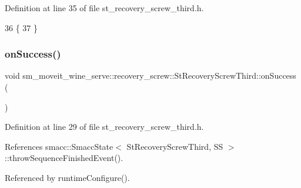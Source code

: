 Definition at line 35 of file st\+\_\+recovery\+\_\+screw\+\_\+third.\+h.


\begin{DoxyCode}
36             \{
37             \}
\end{DoxyCode}
\mbox{\label{structsm__moveit__wine__serve_1_1recovery__screw_1_1StRecoveryScrewThird_a2bbe0e017dd3c7441be93c1911e46614}} 
\subsubsection{\texorpdfstring{on\+Success()}{onSuccess()}}
{\footnotesize\ttfamily void sm\+\_\+moveit\+\_\+wine\+\_\+serve\+::recovery\+\_\+screw\+::\+St\+Recovery\+Screw\+Third\+::on\+Success (\begin{DoxyParamCaption}{ }\end{DoxyParamCaption})\hspace{0.3cm}{\ttfamily [inline]}}



Definition at line 29 of file st\+\_\+recovery\+\_\+screw\+\_\+third.\+h.



References smacc\+::\+Smacc\+State$<$ St\+Recovery\+Screw\+Third, S\+S $>$\+::throw\+Sequence\+Finished\+Event().



Referenced by runtime\+Configure().


